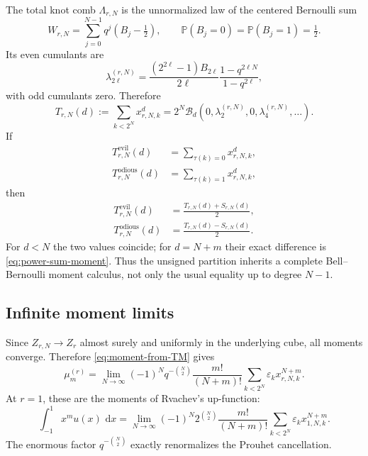 \documentclass[11pt,oneside]{article}
\numberwithin{equation}{section}
\theoremstyle{definition}
\theoremstyle{remark}
\newcommand{\Prob}{\mathbb P}
\newcommand{\dd}{\,\mathrm d}
\newcommand{\eps}{\varepsilon}
\newcommand{\cB}{\mathcal B}
\begin{document}
The total knot comb $\Lambda_{r,N}$ is the unnormalized law of the centered
Bernoulli sum
\begin{equation}
 W_{r,N}=\sum_{j=0}^{N-1}q^j(B_j-\tfrac12),
 \qquad \Prob(B_j=0)=\Prob(B_j=1)=\tfrac12.                \label{eq:W-rN}
\end{equation}
Its even cumulants are
\begin{equation}
 \lambda_{2\ell}^{(r,N)}
 =\frac{(2^{2\ell}-1)B_{2\ell}}{2\ell}
   \frac{1-q^{2\ell N}}{1-q^{2\ell}},                    \label{eq:Bernoulli-knot-cumulants}
\end{equation}
with odd cumulants zero.  Therefore
\begin{equation}
 T_{r,N}(d):=\sum_{k<2^N}x_{r,N,k}^d
 =2^N\cB_d(0,\lambda_2^{(r,N)},0,\lambda_4^{(r,N)},\ldots). \label{eq:total-knot-power}
\end{equation}
If
\begin{align}
 T_{r,N}^{\mathrm{evil}}(d)&=\sum_{\tau(k)=0}x_{r,N,k}^d, \\
 T_{r,N}^{\mathrm{odious}}(d)&=\sum_{\tau(k)=1}x_{r,N,k}^d,
\end{align}
then
\begin{align}
 T_{r,N}^{\mathrm{evil}}(d)
 &=\frac{T_{r,N}(d)+S_{r,N}(d)}2,                          \label{eq:evil-power}\\
 T_{r,N}^{\mathrm{odious}}(d)
 &=\frac{T_{r,N}(d)-S_{r,N}(d)}2.                          \label{eq:odious-power}
\end{align}
For $d<N$ the two values coincide; for $d=N+m$ their exact difference is
\eqref{eq:power-sum-moment}.  Thus the unsigned partition inherits a complete
Bell--Bernoulli moment calculus, not only the usual equality up to degree
$N-1$.

\subsection{Infinite moment limits}

Since $Z_{r,N}\to Z_r$ almost surely and uniformly in the underlying cube,
all moments converge.  Therefore \eqref{eq:moment-from-TM} gives
\begin{equation}
 \boxed{\displaystyle
 \mu_m^{(r)}
 =\lim_{N\to\infty}(-1)^Nq^{-\binom N2}\frac{m!}{(N+m)!}
 \sum_{k<2^N}\eps_kx_{r,N,k}^{N+m}.}                     \label{eq:sparse-moment-TM-limit}
\end{equation}
At $r=1$, these are the moments of Rvachev's up-function:
\begin{equation}
 \int_{-1}^{1}x^m u(x)\,\dd x
 =\lim_{N\to\infty}(-1)^N2^{\binom N2}\frac{m!}{(N+m)!}
 \sum_{k<2^N}\eps_kx_{1,N,k}^{N+m}.                      \label{eq:up-moment-TM-limit}
\end{equation}
The enormous factor $q^{-\binom N2}$ exactly renormalizes the Prouhet
cancellation.
\end{document}
